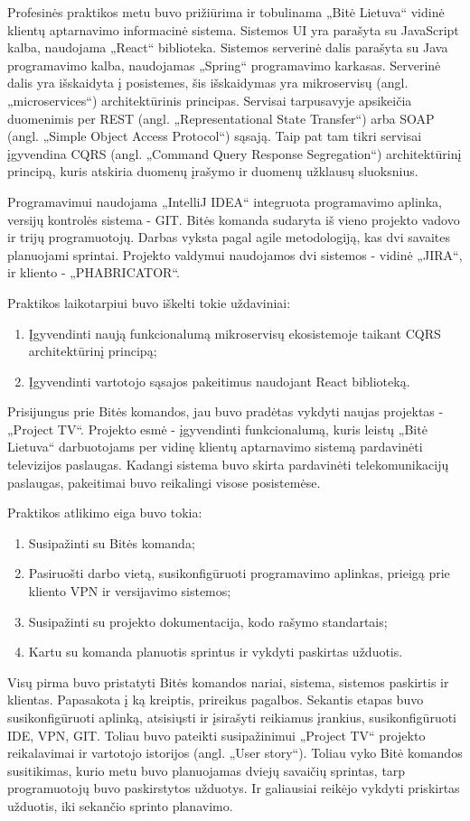 Profesinės praktikos metu buvo prižiūrima ir tobulinama „Bitė Lietuva“ vidinė klientų aptarnavimo informacinė sistema. Sistemos UI yra parašyta su JavaScript kalba,
naudojama „React“ biblioteka. Sistemos serverinė dalis parašyta su Java programavimo kalba, naudojamas „Spring“ programavimo karkasas. Serverinė dalis yra išskaidyta į
posistemes, šis išskaidymas yra mikroservisų (angl. „microservices“) architektūrinis principas. Servisai tarpusavyje apsikeičia duomenimis per
REST (angl. „Representational State Transfer“) arba SOAP (angl. „Simple Object Access Protocol“) sąsają. Taip pat tam tikri servisai įgyvendina
CQRS (angl. „Command Query Response Segregation“) architektūrinį principą, kuris atskiria duomenų įrašymo ir duomenų užklausų sluoksnius.

Programavimui naudojama „IntelliJ IDEA“ integruota programavimo aplinka, versijų kontrolės sistema - GIT. Bitės komanda sudaryta iš vieno projekto vadovo ir trijų programuotojų.
Darbas vyksta pagal agile metodologiją, kas dvi savaites planuojami sprintai. Projekto valdymui naudojamos dvi sistemos - vidinė „JIRA“, ir kliento - „PHABRICATOR“.

\smallskip
Praktikos laikotarpiui buvo iškelti tokie uždaviniai:
\begin{enumerate}
    \item Įgyvendinti naują funkcionalumą mikroservisų ekosistemoje taikant CQRS architektūrinį principą;
    \item Įgyvendinti vartotojo sąsajos pakeitimus naudojant React biblioteką.
\end{enumerate}

\smallskip
Prisijungus prie Bitės komandos, jau buvo pradėtas vykdyti naujas projektas - „Project TV“. Projekto esmė - įgyvendinti funkcionalumą, kuris leistų „Bitė Lietuva“ darbuotojams
per vidinę klientų aptarnavimo sistemą pardavinėti televizijos paslaugas. Kadangi sistema buvo skirta pardavinėti telekomunikacijų paslaugas,
pakeitimai buvo reikalingi visose posistemėse.

\smallskip
Praktikos atlikimo eiga buvo tokia:
\begin{enumerate}
    \item Susipažinti su Bitės komanda;
    \item Pasiruošti darbo vietą, susikonfigūruoti programavimo aplinkas, prieigą prie kliento VPN ir versijavimo sistemos;
    \item Susipažinti su projekto dokumentacija, kodo rašymo standartais;
    \item Kartu su komanda planuotis sprintus ir vykdyti paskirtas užduotis.
\end{enumerate}

\smallskip
Visų pirma buvo pristatyti Bitės komandos nariai, sistema, sistemos paskirtis ir klientas. Papasakota į ką kreiptis, prireikus pagalbos. Sekantis etapas buvo
susikonfigūruoti aplinką, atsisiųsti ir įsirašyti reikiamus įrankius, susikonfigūruoti IDE, VPN, GIT. Toliau buvo pateikti susipažinimui „Project TV“ projekto reikalavimai ir
vartotojo istorijos (angl. „User story“). Toliau vyko Bitė komandos susitikimas, kurio metu buvo planuojamas dviejų savaičių sprintas, tarp programuotojų buvo paskirstytos
užduotys. Ir galiausiai reikėjo vykdyti priskirtas užduotis, iki sekančio sprinto planavimo.
